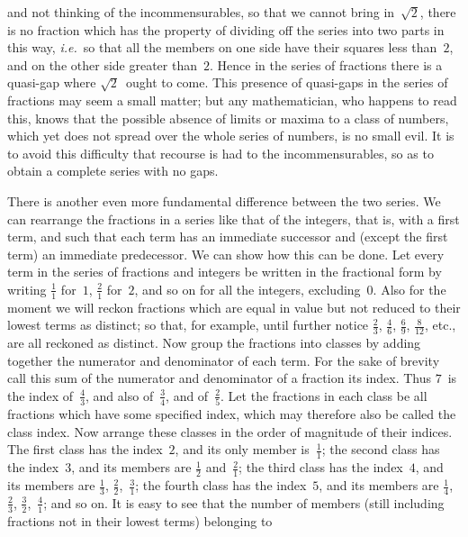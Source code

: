 \documentclass[12pt,leqno]{book}[2005/09/16]
\newcommand{\PageSep}[1]{\ignorespaces}
\newcommand{\ie}{\emph{i.e.}}
\begin{document}
and not thinking of the incommensurables, so
that we cannot bring in~$\sqrt{2}$, there is no fraction
which has the property of dividing off
the series into two parts in this way, \ie\ so
that all the members on one side have their
squares less than~$2$, and on the other side
greater than~$2$. Hence in the series of fractions
\PageSep{77}
there is a quasi-gap where $\sqrt{2}$~ought to
come. This presence of quasi-gaps in the
series of fractions may seem a small matter;
but any mathematician, who happens to read
this, knows that the possible absence of limits
%
or maxima to a class of numbers, which yet
does not spread over the whole series of numbers,
is no small evil. It is to avoid this
difficulty that recourse is had to the incommensurables,
so as to obtain a complete series
with no gaps.

There is another even more fundamental
difference between the two series. We can
rearrange the fractions in a series like that of
the integers, that is, with a first term, and
such that each term has an immediate successor
and (except the first term) an immediate
predecessor. We can show how this can be
done. Let every term in the series of fractions
and integers be written in the fractional form
by writing $\frac{1}{1}$ for~$1$, $\frac{2}{1}$ for~$2$, and so on for all the
integers, excluding~$0$. Also for the moment
we will reckon fractions which are equal in
value but not reduced to their lowest terms
as distinct; so that, for example, until further
notice $\frac{2}{3}$, $\frac{4}{6}$, $\frac{6}{9}$, $\frac{8}{12}$, etc., are all reckoned as distinct.
Now group the fractions into classes
by adding together the numerator and denominator
of each term. For the sake of
brevity call this sum of the numerator and
denominator of a fraction its index. Thus $7$~is
\PageSep{78}
the index of~$\frac{4}{3}$, and also of~$\frac{3}{4}$, and of~$\frac{2}{5}$. Let
the fractions in each class be all fractions
which have some specified index, which may
therefore also be called the class index. Now
arrange these classes in the order of magnitude
of their indices. The first class has
the index~$2$, and its only member is~$\frac{1}{1}$; the
second class has the index~$3$, and its members
are $\frac{1}{2}$ and~$\frac{2}{1}$; the third class has the index~$4$,
and its members are $\frac{1}{3}$, $\frac{2}{2}$,~$\frac{3}{1}$; the fourth
class has the index~$5$, and its members are
$\frac{1}{4}$, $\frac{2}{3}$, $\frac{3}{2}$,~$\frac{4}{1}$; and so on. It is easy to see that
the number of members (still including fractions
not in their lowest terms) belonging to
\end{document}
